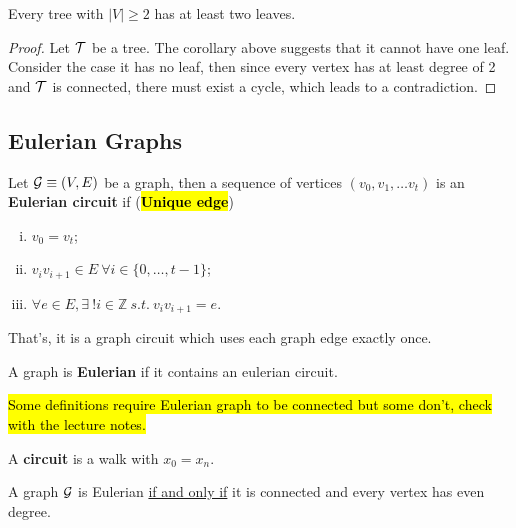 \documentclass{article}
\def\Z{{\mathbb Z}}
\begin{document}
		\begin{proposition}
			Every tree with $|V| \geq 2$ has at least two leaves.
			\begin{proof}
				Let $\mathcal{{T}}$ be a tree. The corollary above suggests that it cannot have one leaf. Consider the case it has no leaf, then since every vertex has at least degree of 2 and $\mathcal{{T}}$ is connected, there must exist a cycle, which leads to a contradiction.
			\end{proof}
		\end{proposition}
		
		\subsection{Eulerian Graphs}
			\begin{definition}
				Let $\mathcal{{G}} \equiv (V, E)$ be a graph, then a sequence of vertices $(v_0,v_1,\dots v_t)$ is an \textbf{Eulerian circuit} if (\hl{\textbf{Unique edge}})
				\begin{enumerate}[(i)]
					\item $v_0 = v_t$;
					\item $v_i v_{i+1} \in E\ \forall i \in \{0, \dots, t-1\}$;
					\item $\forall e \in E, \exists\ ! i \in \Z\ s.t.\ v_i v_{i+1} = e$.
				\end{enumerate}
				That's, it is a graph circuit which uses each graph edge exactly once.
			\end{definition}
			
			\begin{definition}
				A graph is \textbf{Eulerian} if it contains an eulerian circuit.
			\end{definition}
			
			\begin{remark}
				\hl{Some definitions require Eulerian graph to be connected but some don't, check with the lecture notes.}
			\end{remark}
			
			\begin{definition}
				A \textbf{circuit} is a walk with $x_0 = x_n$.
			\end{definition}
			
			\begin{theorem}
				A graph $\mathcal{{G}}$ is Eulerian \ul{if and only if} it is connected and every vertex has even degree.
			\end{theorem}
		
\end{document}
